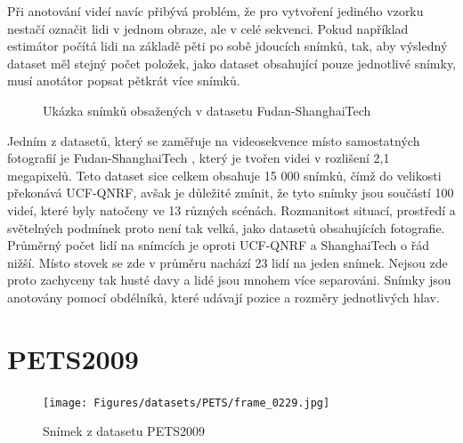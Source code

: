 Při anotování videí navíc přibývá problém, že pro vytvoření jediného vzorku nestačí označit lidi v jednom obraze, ale v celé sekvenci.
Pokud například estimátor počítá lidi na základě pěti po sobě jdoucích snímků, tak, aby výsledný dataset měl stejný počet položek, jako dataset obsahující pouze jednotlivé snímky, musí anotátor popsat pětkrát více snímků.

\begin{figure}[h!]
	\centering
	\caption{Ukázka snímků obsažených v datasetu Fudan-ShanghaiTech \cite{ShanghaiTech}}
	\label{fig:FDST}
\end{figure}


Jedním z datasetů, který se zaměřuje na videosekvence místo samostatných fotografií je Fudan-ShanghaiTech \cite{fdst_dataset}, který je tvořen videi v rozlišení 2,1 megapixelů.
Teto dataset sice celkem obsahuje 15 000 snímků, čímž do velikosti překonává UCF-QNRF, avšak je důležité zmínit, že tyto snímky jsou součástí 100 videí, které byly natočeny ve 13 různých scénách.
Rozmanitost situací, prostředí a světelných podmínek proto není tak velká, jako datasetů obsahujících fotografie.
Průměrný počet lidí na snímcích je oproti UCF-QNRF a ShanghaiTech o řád nižší. Místo stovek se zde v průměru nachází 23 lidí na jeden snímek.
Nejsou zde proto zachyceny tak husté davy a lidé jsou mnohem více separováni.
Snímky jsou anotovány pomocí obdélníků, které udávají pozice a rozměry jednotlivých hlav.

\section{PETS2009}
\begin{figure}[h!]
	\centering
	\texttt{[image: Figures/datasets/PETS/frame\_0229.jpg]}
	\caption{Snímek z datasetu PETS2009 \cite{PETS2009}}
	\label{fig:FDST}
\end{figure}


